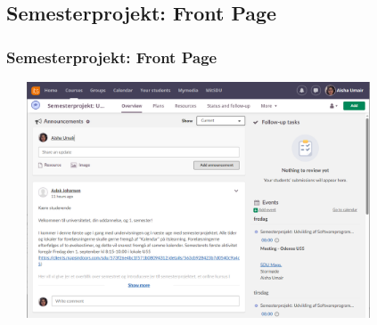 \documentclass[t, aspectratio=169]{beamer}
\begin{document}
\subsection{Semesterprojekt: Front Page}
\begin{frame}[fragile]
  \frametitle{Semesterprojekt: Front Page}
  \vspace{-1mm}
  \begin{center}
    \includegraphics[width=11.4cm,height=7cm]{figs/itslearning/overview.png}
  \end{center}
\end{frame}
\end{document}
